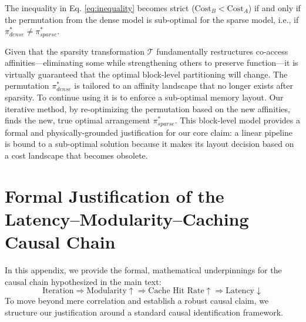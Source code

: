 \documentclass{article}
\begin{document}
The inequality in Eq. \ref{eq:inequality} becomes strict ($\text{Cost}_B < \text{Cost}_A$) if and only if the permutation from the dense model is sub-optimal for the sparse model, i.e., if $\pi^*_{dense} \neq \pi^*_{sparse}$.

Given that the sparsity transformation $\mathcal{T}$ fundamentally restructures co-access affinities—eliminating some while strengthening others to preserve function—it is virtually guaranteed that the optimal block-level partitioning will change. The permutation $\pi^*_{dense}$ is tailored to an affinity landscape that no longer exists after sparsity. To continue using it is to enforce a sub-optimal memory layout. Our iterative method, by re-optimizing the permutation based on the new affinities, finds the new, true optimal arrangement $\pi^*_{sparse}$. This block-level model provides a formal and physically-grounded justification for our core claim: a linear pipeline is bound to a sub-optimal solution because it makes its layout decision based on a cost landscape that becomes obsolete.

\section{Formal Justification of the Latency–Modularity–Caching Causal Chain}
\label{app:causal_chain}

In this appendix, we provide the formal, mathematical underpinnings for the causal chain hypothesized in the main text:
\[
\text{Iteration} \Rightarrow \text{Modularity} \uparrow \Rightarrow \text{Cache Hit Rate} \uparrow \Rightarrow \text{Latency} \downarrow
\]
To move beyond mere correlation and establish a robust causal claim, we structure our justification around a standard causal identification framework.
\end{document}
